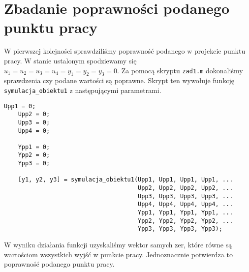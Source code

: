 \chapter{Zbadanie poprawności podanego punktu pracy}
\label{pro1}

W pierwszej kolejności sprawdziliśmy poprawność podanego w projekcie 
punktu pracy. W stanie ustalonym spodziewamy się $u_{\mathrm{1}} = u_{\mathrm{2}} 
= u_{\mathrm{3}} = u_{\mathrm{4}} = y_{\mathrm{1}} = y_{\mathrm{2}} = 
y_{\mathrm{3}} = 0$. Za pomocą skryptu \verb+zad1.m+ dokonaliśmy sprawdzenia
czy podane wartości są poprawne. Skrypt ten wywołuje funkcję
\verb+symulacja_obiektu1+ z następującymi parametrami.


\begin{lstlisting}[style=custommatlab,frame=single,label={pro1},caption={Sprawdzenie poprawności podanego punktu pracy},captionpos=b]
    Upp1 = 0;
    Upp2 = 0;
    Upp3 = 0;
    Upp4 = 0;

    Ypp1 = 0;
    Ypp2 = 0;
    Ypp3 = 0;

    [y1, y2, y3] = symulacja_obiektu1(Upp1, Upp1, Upp1, Upp1, ...
                                      Upp2, Upp2, Upp2, Upp2, ...
                                      Upp3, Upp3, Upp3, Upp3, ...
                                      Upp4, Upp4, Upp4, Upp4, ...
                                      Ypp1, Ypp1, Ypp1, Ypp1, ...
                                      Ypp2, Ypp2, Ypp2, Ypp2, ...
                                      Ypp3, Ypp3, Ypp3, Ypp3);
\end{lstlisting}

W wyniku działania funkcji uzyskaliśmy wektor samych zer, które równe są wartościom wszystkich wyjść w punkcie pracy.
Jednoznacznie potwierdza to poprawność podanego punktu pracy.